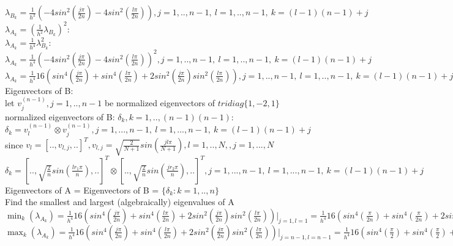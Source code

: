 \documentclass[12pt,letter]{article}
\begin{document}
\begin{enumerate}
\begin{enumerate}
    $\lambda_{B_k} = \frac{1}{h^2}(-4sin^2(\frac{j \pi}{2n}) -4sin^2(\frac{l \pi}{2n})), j=1,..,n-1,\ l=1,..,n-1,\ k=(l-1)(n-1)+j$\\

    $\lambda_{A_k} = (\frac{1}{h^2}\lambda_{B_k})^2$:\\    
    $\lambda_{A_k} = \frac{1}{h^4}\lambda_{B_k}^2$:\\    
    $\lambda_{A_k} = \frac{1}{h^4}(-4sin^2(\frac{j \pi}{2n}) -4sin^2(\frac{l \pi}{2n}))^2, j=1,..,n-1,\ l=1,..,n-1,\ k=(l-1)(n-1)+j$\\
    $\lambda_{A_k} = \frac{1}{h^4}16(sin^4(\frac{j \pi}{2n}) +sin^4(\frac{l \pi}{2n}) +2 sin^2(\frac{j \pi}{2n})sin^2(\frac{l \pi}{2n}) ), j=1,..,n-1,\ l=1,..,n-1,\ k=(l-1)(n-1)+j$\\
    
    Eigenvectors of B:\\

    let $v_j^{(n-1)}, j=1,..,n-1$ be normalized eigenvectors of $tridiag\{1,-2,1\}$\\
    normalized eigenvectors of B: $\delta_k, k=1,..,(n-1)(n-1)$:\\
    $\delta_k=v_l^{(n-1)} \otimes v_j^{(n-1)}, j=1,...,n-1,\ l=1,...,n-1,\ k=(l-1)(n-1)+j$\\

    since $v_l = [.., v_{l,j}, ..]^T, v_{l,j}=\sqrt{\frac{2}{N+1}}sin(\frac{jl \pi}{N+1}),l=1,..,N,, j=1,...,N$\\
    
    $\delta_k= [.., \sqrt{\frac{2}{n}}sin(\frac{lr_1 \pi}{n}), ..]^T \otimes
    [.., \sqrt{\frac{2}{n}}sin(\frac{j r_2 \pi}{n}), ..]^T, j=1,...,n-1,\ l=1,...,n-1,\ k=(l-1)(n-1)+j$\\

    Eigenvectors of A = Eigenvectors of B = $\{ \delta_k: k=1,..,n\}$\\
    
    Find the smallest and largest (algebraically) eigenvalues of A\\
    
    $\min_k(\lambda_{A_k}) = \frac{1}{h^4}16(sin^4(\frac{j \pi}{2n}) +sin^4(\frac{l \pi}{2n}) +2 sin^2(\frac{j \pi}{2n})sin^2(\frac{l \pi}{2n}) )|_{j=1,l=1}=\frac{1}{h^4}16(sin^4(\frac{\pi}{2n}) +sin^4(\frac{\pi}{2n}) +2 sin^2(\frac{\pi}{2n})sin^2(\frac{\pi}{2n}))$\\
    
    $\max_k(\lambda_{A_k}) = \frac{1}{h^4}16(sin^4(\frac{j \pi}{2n}) +sin^4(\frac{l \pi}{2n}) +2 sin^2(\frac{j \pi}{2n})sin^2(\frac{l \pi}{2n}) )|_{j=n-1,l=n-1} = \frac{1}{h^4}16(sin^4(\frac{\pi}{2}) +sin^4(\frac{\pi}{2}) +2 sin^2(\frac{\pi}{2})sin^2(\frac{\pi}{2}) ) \approx \frac{1}{h^4}16(1 +1 +2)=\frac{64}{h^4}$\\


\end{enumerate}
\end{enumerate}
\end{document}
